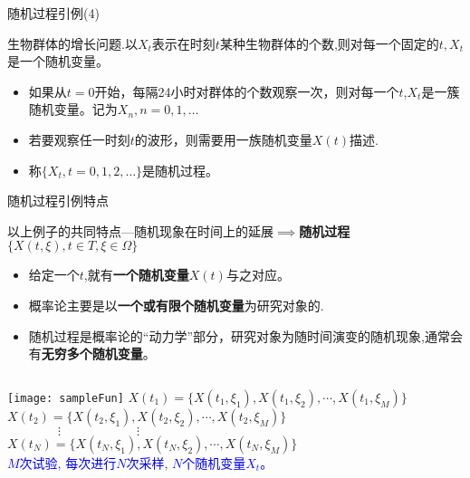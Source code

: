 \begin{frame}{随机过程引例(4)}
\begin{example}
	生物群体的增长问题.以$X_t$表示在时刻$t$某种生物群体的个数,则对每一个固定的$t,X_t$是一个随机变量。　
	\begin{itemize}
		\item 如果从$t=0$开始，每隔24小时对群体的个数观察一次，则对每一个$t$,$X_t$是一簇随机变量。记为$X_n,n=0,1,\dots$
		\item 若要观察任一时刻$t$的波形，则需要用一族随机变量$X(t)$描述. 
		\item 称$\{X_t,t=0,1,2,\dots\}$是随机过程。
	\end{itemize}	
\end{example}
\end{frame}

\begin{frame}{随机过程引例特点}
\begin{block}{以上例子的共同特点---随机现象在时间上的延展$\implies$\textbf{随机过程$\{X(t,\xi),t\in T,\xi\in \Omega\}$}}
	\begin{itemize}
		\item 给定一个$t$,就有\textbf{一个随机变量$X(t)$}与之对应。
		\item 概率论主要是以\textbf{一个或有限个随机变量}为研究对象的.
		\item 随机过程是概率论的``动力学''部分，研究对象为随时间演变的随机现象,通常会有\textbf{无穷多个随机变量}。
	\end{itemize}
\end{block}
\begin{columns}
	\texttt{[image: sampleFun]}
	\small
	$X(t_1)=\{X(t_1,\xi_1), X(t_1,\xi_2),\cdots, X(t_1,\xi_M)\}$	\\
	$X(t_2)=\{X(t_2,\xi_1), X(t_2,\xi_2),\cdots, X(t_2,\xi_M)\}$	\\
	$\qquad\qquad\vdots\qquad\qquad\qquad\vdots$\\
	$X(t_N)=\{X(t_N,\xi_1), X(t_N,\xi_2),\cdots, X(t_N,\xi_M)\}$\\
	\textcolor{blue}{$M$次试验, 每次进行$N$次采样, $N$个随机变量$X_{t}$。}
\end{columns}	
\end{frame}

